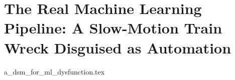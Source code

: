 \part{The Real Machine Learning Pipeline: A Slow-Motion Train Wreck Disguised as Automation}

{a_dsm_for_ml_dysfunction.tex}
%
%
%
%
%
%
%
%
%